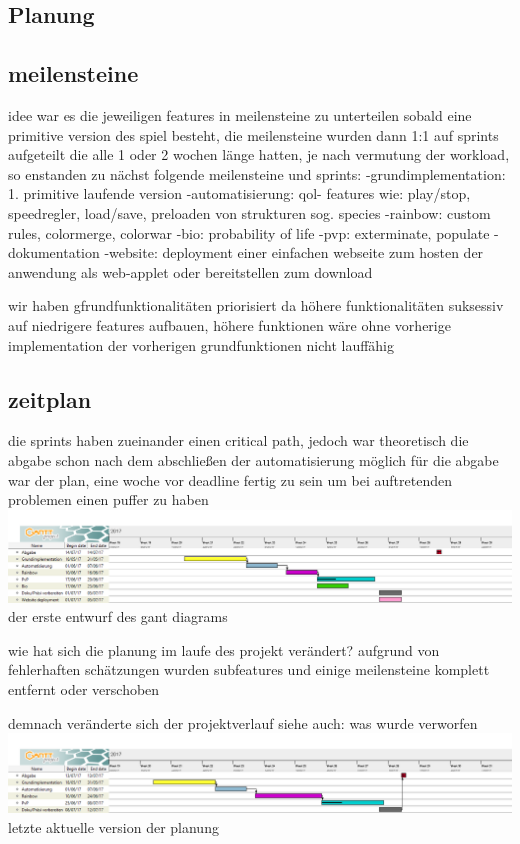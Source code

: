 \documentclass[12pt]{article}
\theoremstyle{plain}
\begin{document}
\begin{linenumbers}
\section{Planung}

\subsection{meilensteine}
idee war es die jeweiligen features in meilensteine zu unterteilen sobald eine primitive version des spiel besteht, die meilensteine wurden dann 1:1 auf sprints aufgeteilt die alle 1 oder 2 wochen länge hatten,
je nach vermutung der workload, so enstanden zu nächst folgende meilensteine und sprints:
-grundimplementation: 1. primitive laufende version
-automatisierung: qol- features wie: play/stop, speedregler, load/save, preloaden von strukturen sog. species
-rainbow: custom rules, colormerge, colorwar
-bio: probability of life
-pvp: exterminate, populate
-dokumentation
-website: deployment einer einfachen webseite zum hosten der anwendung als web-applet oder bereitstellen zum download

wir haben gfrundfunktionalitäten priorisiert da höhere funktionalitäten suksessiv auf niedrigere features aufbauen,
höhere funktionen wäre ohne vorherige implementation der vorherigen grundfunktionen nicht lauffähig

\subsection{zeitplan}
die sprints haben zueinander einen critical path, jedoch war theoretisch die abgabe schon nach dem abschließen der automatisierung möglich
für die abgabe war der plan, eine woche vor deadline fertig zu sein um bei auftretenden problemen einen puffer zu haben
\newline
\includegraphics{images/ganttdep.png}
\newline
der erste entwurf des gant diagrams

wie hat sich die planung im laufe des projekt verändert?
aufgrund von fehlerhaften schätzungen wurden subfeatures und einige meilensteine komplett entfernt oder verschoben

demnach veränderte sich der projektverlauf
siehe auch: was wurde verworfen
\newline
\includegraphics{images/gant.png}
\newline
letzte aktuelle version der planung


\end{linenumbers}
\end{document}
